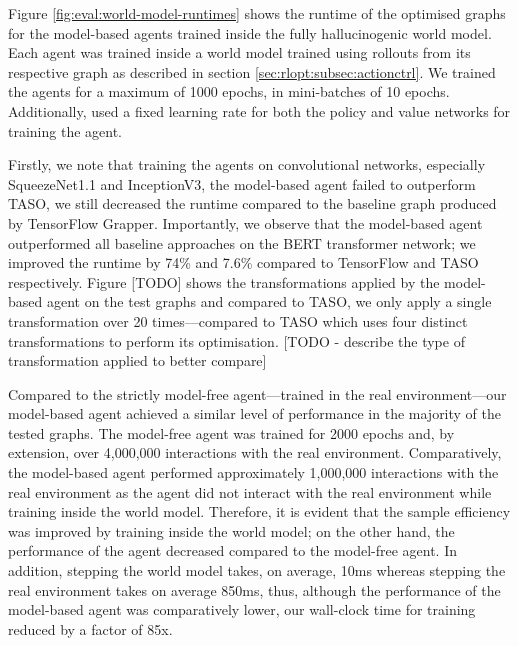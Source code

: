 Figure \ref{fig:eval:world-model-runtimes} shows the runtime of the optimised graphs for the model-based agents trained inside the fully hallucinogenic world model. Each agent was trained inside a world model trained using rollouts from its respective graph as described in section \ref{sec:rlopt:subsec:actionctrl}. We trained the agents for a maximum of 1000 epochs, in mini-batches of 10 epochs. Additionally, used a fixed learning rate for both the policy and value networks for training the agent.

Firstly, we note that training the agents on convolutional networks, especially SqueezeNet1.1 and InceptionV3, the model-based agent failed to outperform TASO, we still decreased the runtime compared to the baseline graph produced by TensorFlow Grapper. Importantly, we observe that the model-based agent outperformed all baseline approaches on the BERT transformer network; we improved the runtime by 74\% and 7.6\% compared to TensorFlow and TASO respectively. Figure [TODO] shows the transformations applied by the model-based agent on the test graphs and compared to TASO, we only apply a single transformation over 20 times---compared to TASO which uses four distinct transformations to perform its optimisation. [TODO - describe the type of transformation applied to better compare]

Compared to the strictly model-free agent---trained in the real environment---our model-based agent achieved a similar level of performance in the majority of the tested graphs. The model-free agent was trained for 2000 epochs and, by extension, over 4,000,000 interactions with the real environment. Comparatively, the model-based agent performed approximately 1,000,000 interactions with the real environment as the agent did not interact with the real environment while training inside the world model. Therefore, it is evident that the sample efficiency was improved by training inside the world model; on the other hand, the performance of the agent decreased compared to the model-free agent. In addition, stepping the world model takes, on average, 10ms whereas stepping the real environment takes on average 850ms, thus, although the performance of the model-based agent was comparatively lower, our wall-clock time for training reduced by a factor of 85x.

